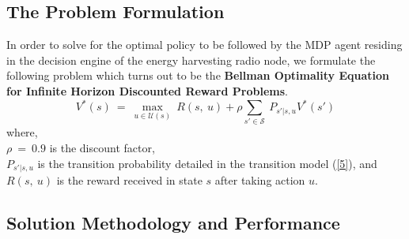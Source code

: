 \documentclass[12pt, draftcls, onecolumn]{IEEEtran}
\begin{document}
\subsection{The Problem Formulation}
In order to solve for the optimal policy to be followed by the MDP agent residing in the decision engine of the energy harvesting radio node, we formulate the following problem which turns out to be the \textbf{Bellman Optimality Equation for Infinite Horizon Discounted Reward Problems}.
\begin{equation}\label{6}
    V^*(s)\ =\ \max_{u \in \mathcal{U}(s)}\ R(s,\ u) + \rho \sum_{s' \in \mathcal{S}}\ P_{s'|s,u}V^*(s')
\end{equation}
where,
\\$\rho\ =\ 0.9$ is the discount factor,
\\$P_{s'|s,u}$ is the transition probability detailed in the transition model (\ref{5}), and
\\$R(s,\ u)$ is the reward received in state $s$ after taking action $u$.
\subsection{Solution Methodology and Performance}
\end{document}
